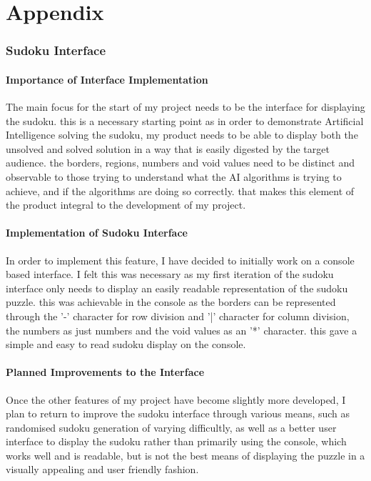 \documentclass[]{final_report}
\begin{document}
\label{endpage}

\chapter*{Appendix}
\subsection*{Sudoku Interface}

\subsubsection{Importance of Interface Implementation}

The main focus for the start of my project needs to be the interface for displaying the sudoku. this is a necessary starting point as in order to demonstrate Artificial Intelligence solving the sudoku, my product needs to be able to display both the unsolved and solved solution in a way that is easily digested by the target audience. the borders, regions, numbers and void values need to be distinct and observable to those trying to understand what the AI algorithms is trying to achieve, and if the algorithms are doing so correctly. that makes this element of the product integral to the development of my project. 

\subsubsection{Implementation of Sudoku Interface}

In order to implement this feature, I have decided to initially work on a console based interface. I felt this was necessary as my first iteration of the sudoku interface only needs to display an easily readable representation of the sudoku puzzle. this was achievable in the console as the borders can be represented through the '-' character for row division and '|' character for column division, the numbers as just numbers and the void values as an '*' character. this gave a simple and easy to read sudoku display on the console. 

\subsubsection{Planned Improvements to the Interface} 

Once the other features of my project have become slightly more developed, I plan to return to improve the sudoku interface through various means, such as randomised sudoku generation of varying difficultly, as well as a better user interface to display the sudoku rather than primarily using the console, which works well and is readable, but is not the best means of displaying the puzzle in a visually appealing and user friendly fashion. 
\end{document}
